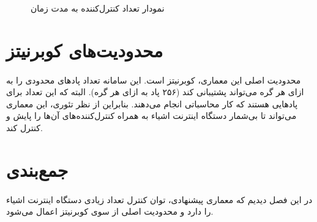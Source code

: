 {    \begin{figure}[H]
        \caption{نمودار تعداد کنترل‌کننده به مدت زمان}
        \label{fig:different_controllers_plot}
    \end{figure}
}

\section{محدودیت‌های کوبرنیتز}
\label{sec:kubernetes_limitations}
\paragraph{}
{
    محدودیت اصلی این معماری، کوبرنیتز است. این سامانه تعداد پاد‌های محدودی را به ازای هر گره می‌تواند پشتیبانی کند (۲۵۶ پاد به ازای هر گره).
    البته که این تعداد برای پاد‌هایی هستند که کار محاسباتی انجام می‌دهند. بنابراین از نظر تئوری، این معماری می‌تواند تا 
    بی‌شمار دستگاه اینترنت‌ اشیاء به همراه کنترل‌کننده‌های آن‌ها را پایش و کنترل کند.
}

\section{جمع‌بندی}
\paragraph{}
{
    در این فصل دیدیم که معماری پیشنهادی، توان کنترل تعداد زیادی دستگاه‌ اینترنت اشیاء را دارد و محدودیت اصلی از سوی کوبرنیتز
    اعمال می‌شود.
}